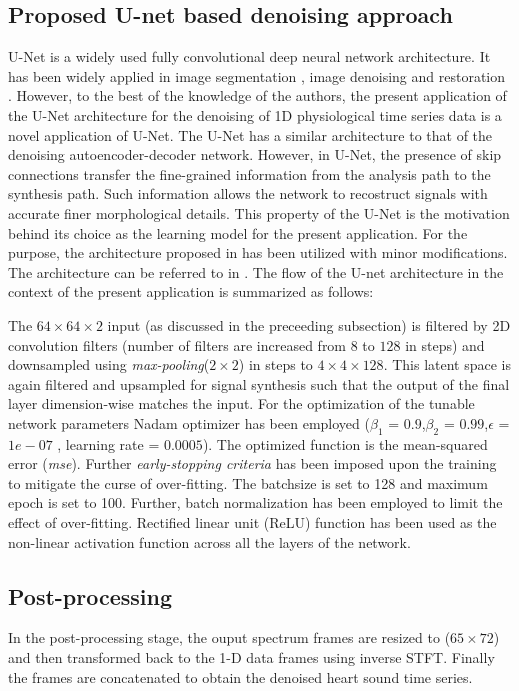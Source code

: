 \documentclass[sigconf,screen]{acmart}
\begin{document}
\subsection{Proposed U-net based denoising approach }
U-Net is a widely used fully convolutional deep neural network architecture. It has been widely applied in image segmentation \cite{ronneberger2015u}, image denoising \cite{bao2020real} and restoration \cite{aghabiglou2021projection}. However, to the best of the knowledge of the authors, the present application of the U-Net architecture for the denoising of 1D physiological time series data is a novel application of U-Net. The U-Net has a similar architecture to that of the denoising autoencoder-decoder network. However, in U-Net, the presence of skip connections transfer the fine-grained information from the  analysis path to the synthesis path. Such information allows the network to recostruct signals with accurate finer morphological details. This property of the U-Net is the motivation behind its choice as the learning model for the present application. For the purpose, the architecture proposed in  \cite{ronneberger2015u} has been utilized with minor modifications. The architecture can be referred to in \cite{ronneberger2015u}.
The flow of the U-net architecture in the context of the present application is summarized as follows:

 The $64\times64\times2$ input (as discussed in the preceeding subsection) is filtered by 2D convolution filters (number of filters are increased from $8$ to $128$ in steps) and downsampled using \textit{max-pooling}($2\times2$) in steps to $4\times4\times128$. This latent space is again filtered and upsampled for signal synthesis such that the output of the final layer dimension-wise matches the input. For the optimization of the tunable network parameters Nadam optimizer has been employed ($\beta_{1}$ = $0.9$,$\beta_{2}$ = $0.99$,$\epsilon$ = $1e-07$ , learning rate = $0.0005$). The optimized function is the mean-squared error (\textit{mse}). Further \textit{early-stopping criteria} has been imposed upon the training to mitigate the curse of over-fitting. The batchsize is set to 128 and maximum epoch is set to 100. Further, batch normalization has been employed to limit the effect of over-fitting. Rectified linear unit (ReLU) function has been used as the non-linear activation function across all the layers of the network.   
\subsection{Post-processing}
In the post-processing stage, the ouput spectrum frames are  resized to ($65\times72$) and then transformed back to the 1-D data frames using inverse STFT. Finally the frames are concatenated to obtain the denoised heart sound time series.
\end{document}
